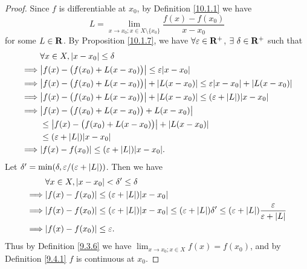 \begin{proof}
    Since \(f\) is differentiable at \(x_0\), by Definition \ref{10.1.1} we have
    \[
        L = \lim_{x \to x_0 ; x \in X \setminus \{x_0\}} \frac{f(x) - f(x_0)}{x - x_0}
    \]
    for some \(L \in \mathbf{R}\).
    By Proposition \ref{10.1.7}, we have \(\forall \varepsilon \in \mathbf{R}^+\), \(\exists\ \delta \in \mathbf{R}^+\) such that
    \begin{align*}
                 & \forall x \in X, \abs{x - x_0} \leq \delta                                                                      \\
        \implies & \abs{f(x) - \big(f(x_0) + L(x - x_0)\big)} \leq \varepsilon \abs{x - x_0}                                       \\
        \implies & \abs{f(x) - \big(f(x_0) + L(x - x_0)\big)} + \abs{L(x - x_0)} \leq \varepsilon \abs{x - x_0} + \abs{L(x - x_0)} \\
        \implies & \abs{f(x) - \big(f(x_0) + L(x - x_0)\big)} + \abs{L(x - x_0)} \leq (\varepsilon + \abs{L}) \abs{x - x_0}        \\
        \implies & \abs{f(x) - \big(f(x_0) + L(x - x_0)\big) + L(x - x_0)}                                                         \\
                 & \leq \abs{f(x) - \big(f(x_0) + L(x - x_0)\big)} + \abs{L(x - x_0)}                                              \\
                 & \leq (\varepsilon + \abs{L}) \abs{x - x_0}                                                                      \\
        \implies & \abs{f(x) - f(x_0)} \leq (\varepsilon + \abs{L}) \abs{x - x_0}.
    \end{align*}
    Let \(\delta' = \min(\delta, \varepsilon / (\varepsilon + \left\lvert L\right\rvert))\).
    Then we have
    \begin{align*}
                 & \forall x \in X, \abs{x - x_0} < \delta' \leq \delta                                                                                                                       \\
        \implies & \abs{f(x) - f(x_0)} \leq (\varepsilon + \abs{L}) \abs{x - x_0}                                                                                                             \\
        \implies & \abs{f(x) - f(x_0)} \leq (\varepsilon + \abs{L}) \abs{x - x_0} \leq (\varepsilon + \abs{L}) \delta' \leq (\varepsilon + \abs{L}) \frac{\varepsilon}{\varepsilon + \abs{L}} \\
        \implies & \abs{f(x) - f(x_0)} \leq \varepsilon.
    \end{align*}
    Thus by Definition \ref{9.3.6} we have \(\lim_{x \to x_0 ; x \in X} f(x) = f(x_0)\), and by Definition \ref{9.4.1} \(f\) is continuous at \(x_0\).
\end{proof}

